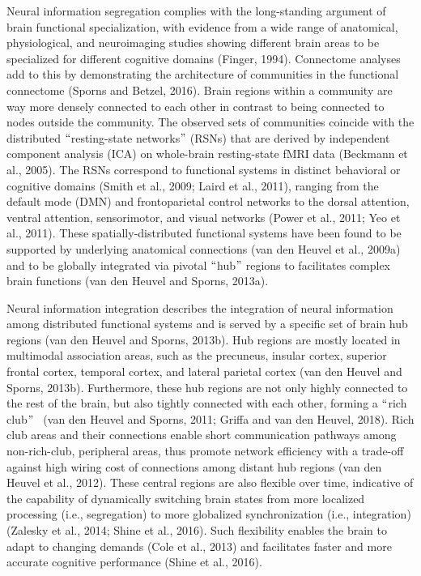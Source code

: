 \begin{refsection}
Neural information segregation complies with the long-standing argument of brain functional specialization, with evidence from a wide range of anatomical, physiological, and neuroimaging studies showing different brain areas to be specialized for different cognitive domains (Finger, 1994). Connectome analyses add to this by demonstrating the architecture of communities in the functional connectome (Sporns and Betzel, 2016). Brain regions within a community are way more densely connected to each other in contrast to being connected to nodes outside the community. The observed sets of communities coincide with the distributed $``$resting-state networks$"$  (RSNs) that are derived by independent component analysis (ICA) on whole-brain resting-state fMRI data (Beckmann et al., 2005). The RSNs correspond to functional systems in distinct behavioral or cognitive domains (Smith et al., 2009; Laird et al., 2011), ranging from the default mode (DMN) and frontoparietal control networks to the dorsal attention, ventral attention, sensorimotor, and visual networks (Power et al., 2011; Yeo et al., 2011). These spatially-distributed functional systems have been found to be supported by underlying anatomical connections (van den Heuvel et al., 2009a) and to be globally integrated via pivotal $``$hub$"$  regions to facilitates complex brain functions (van den Heuvel and Sporns, 2013a).

Neural information integration describes the integration of neural information among distributed functional systems and is served by a specific set of brain hub regions (van den Heuvel and Sporns, 2013b). Hub regions are mostly located in multimodal association areas, such as the precuneus, insular cortex, superior frontal cortex, temporal cortex, and lateral parietal cortex (van den Heuvel and Sporns, 2013b). Furthermore, these hub regions are not only highly connected to the rest of the brain, but also tightly connected with each other, forming a $``$rich club$"$ \  (van den Heuvel and Sporns, 2011; Griffa and van den Heuvel, 2018). Rich club areas and their connections enable short communication pathways among non-rich-club, peripheral areas, thus promote network efficiency with a trade-off against high wiring cost of connections among distant hub regions (van den Heuvel et al., 2012). These central regions are also flexible over time, indicative of the capability of dynamically switching brain states from more localized processing (i.e., segregation) to more globalized synchronization (i.e., integration) (Zalesky et al., 2014; Shine et al., 2016). Such flexibility enables the brain to adapt to changing demands (Cole et al., 2013) and facilitates faster and more accurate cognitive performance (Shine et al., 2016).


\end{refsection}

